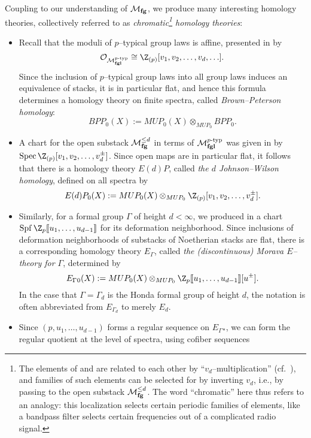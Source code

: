 \begin{definition}\label{DefnChromaticHomologyThys}
Coupling  to our understanding of $\mathcal{M}_{\mathbf{fg}}$, we produce many interesting homology theories, collectively referred to as \textit{chromatic\footnote{The elements of  and  are related to each other by ``$v_d$--multiplication'' (cf.\ ), and families of such elements can be selected for by inverting $v_d$, i.e., by passing to the open substack $\mathcal{M}_{\mathbf{fg}}^{\le d}$.  The word ``chromatic'' here thus refers to an analogy: this localization selects certain periodic families of elements, like a bandpass filter selects certain frequencies out of a complicated radio signal.} homology theories}:
\begin{itemize}
\item Recall that the moduli of $p$--typical group laws is affine, presented in  by \[\sheaf O_{\moduli{fgl}^{\ptyp}} \cong \Z_{(p)}[v_1, v_2, \ldots, v_d, \ldots].\]  Since the inclusion of $p$--typical group laws into all group laws induces an equivalence of stacks, it is in particular flat, and hence this formula determines a homology theory on finite spectra, called \textit{Brown--Peterson homology}: \[BPP_0(X) := MUP_0(X) \otimes_{MUP_0} BPP_0.\]
\item A chart for the open substack $\mathcal{M}_{\mathbf{fg}}^{\le d}$ in terms of $\mathcal{M}_{\mathbf{fgl}}^{p\text{-}\mathrm{typ}}$ was given in  by $\Spec \Z_{(p)}[v_1, v_2, \ldots, v_d^\pm]$.  Since open maps are in particular flat, it follows that there is a homology theory $E(d)P$, called \textit{the $d${\th} Johnson--Wilson homology}, defined on all spectra by \[E(d)P_0(X) := MUP_0(X) \otimes_{MUP_0} \Z_{(p)}[v_1, v_2, \ldots, v_d^\pm].\]
\item Similarly, for a formal group $\Gamma$ of height $d < \infty$, we produced in  a chart $\Spf \Z_p\ps{u_1, \ldots, u_{d-1}}$ for its deformation neighborhood.  Since inclusions of deformation neighborhoods of substacks of Noetherian stacks are flat, there is a corresponding homology theory $E_\Gamma{}$, called \textit{the (discontinuous) Morava $E$--theory for $\Gamma$}, determined by \[E_\Gamma{}_0(X) := MUP_0(X) \otimes_{MUP_0} \Z_p\ps{u_1, \ldots, u_{d-1}}[u^\pm].\]  In the case that $\Gamma = \Gamma_d$ is the Honda formal group of height $d$, the notation is often abbreviated from $E_{\Gamma_d}$ to merely $E_d$.
\item Since $(p, u_1, \ldots, u_{d-1})$ forms a regular sequence on $E_\Gamma{}_*$, we can form the regular quotient at the level of spectra, using cofiber sequences

\end{itemize}
\end{definition}
